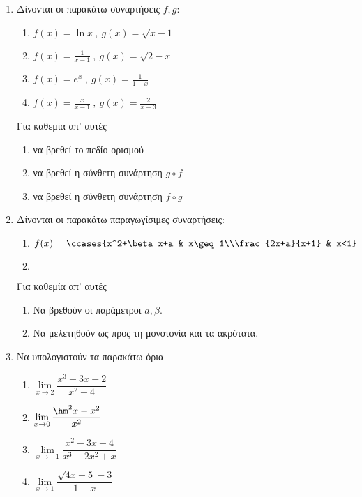 \documentclass[10pt,a4paper]{article}
\begin{document}
\begin{enumerate}
\begin{enumerate}[itemsep=0mm,label=\alph*.]
\end{enumerate}
\item Δίνονται οι παρακάτω συναρτήσεις $ f,g $:
\begin{multicols}{2}
\begin{enumerate}[itemsep=0mm,label=\roman*.]
\item $ f(x)=\ln{x}\ ,\ g(x)=\sqrt{x-1} $
\item $ f(x)=\frac{1}{x-1}\ ,\ g(x)=\sqrt{2-x} $
\item $ f(x)=e^x\ ,\ g(x)=\frac{1}{1-x} $
\item $ f(x)=\frac{x}{x-1}\ ,\ g(x)=\frac{2}{x-3} $
\end{enumerate}
\end{multicols}
Για καθεμία απ' αυτές
\begin{enumerate}[itemsep=0mm,label=\alph*.]
\item να βρεθεί το πεδίο ορισμού
\item να βρεθεί η σύνθετη συνάρτηση $ g\circ f $
\item να βρεθεί η σύνθετη συνάρτηση $ f\circ g $
\end{enumerate}
\item Δίνονται οι παρακάτω παραγωγίσιμες συναρτήσεις:
\begin{multicols}{2}
\begin{enumerate}[itemsep=0mm,label=\roman*.]
\item $ f(x)=\ccases{x^2+\beta x+a & x\geq1\\\frac{2x+a}{x+1} & x<1} $
\item $  $
\end{enumerate}
\end{multicols}
Για καθεμία απ' αυτές
\begin{enumerate}[itemsep=0mm,label=\alph*.]
\item Να βρεθούν οι παράμετροι $ a,\beta $.
\item Να μελετηθούν ως προς τη μονοτονία και τα ακρότατα.
\end{enumerate}
\item Να υπολογιστούν τα παρακάτω όρια
\begin{multicols}{3}
\begin{enumerate}[itemsep=0mm,label=\roman*.]
\item $ \lim\limits_{x\to 2}\dfrac{x^3-3x-2}{x^2-4} $
\item $ \lim\limits_{x\to 0}\dfrac{\hm^2{x}-x^2}{x^2} $
\item $ \lim\limits_{x\to -1}\dfrac{x^2-3x+4}{x^3-2x^2+x} $
\item $ \lim\limits_{x\to 1}\dfrac{\sqrt{4x+5}-3}{1-x} $

\end{enumerate}
\end{multicols}
\end{enumerate}
\end{document}
